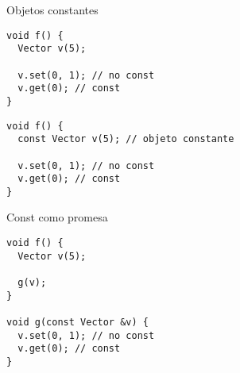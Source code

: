 \begin{frame}[fragile]{Objetos constantes}
        \begin{lstlisting}[style=normal,firstnumber=17]
void f() {
  Vector v(5);

  v.set(0, 1); // no const
  v.get(0); // const
}

        \end{lstlisting}
        \pause
        \begin{lstlisting}[style=normal,firstnumber=24,linebackgroundcolor={%
                 \btLstHLR<2>{27}%
         }]
void f() {
  const Vector v(5); // objeto constante

  v.set(0, 1); // no const
  v.get(0); // const
}
        \end{lstlisting}
\end{frame}

\begin{frame}[fragile]{Const como promesa}
        \begin{lstlisting}[style=normal,firstnumber=17,linebackgroundcolor={%
                 \btLstHLB<1>{23}%
                 \btLstHLR<1>{24}%
         }]
void f() {
  Vector v(5);

  g(v);
}

void g(const Vector &v) {
  v.set(0, 1); // no const
  v.get(0); // const
}
        \end{lstlisting}
\end{frame}


